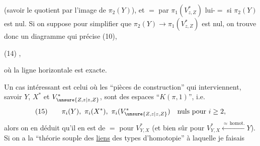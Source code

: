 (savoir le quotient par l'image de $\pi_2(Y)$),
et $=$ par $\pi_1(V^*_{z,Z})$ lui-$=$ si $\pi_2(Y)$ est
nul. Si on suppose pour simplifier
que $\pi_2(Y)\longrightarrow\pi_1(V^*_{z,Z})$ est nul, on trouve
donc un diagramme qui précise (10),

\noindent (14)
,

où la ligne horizontale est exacte.

Un cas intéressant est celui où les
``pièces de construction'' qui  interviennent,
savoir $Y$, $X^*$ et $V^*_{\unsure{Z,z|z,Z}}$, sont des espaces
``$K(\pi,1)$'', i.e.
\[
(15)\qquad \pi_i(Y),\ \pi_i(X^*),\ \pi_i(V^*_{\unsure{Z,z|z,Z}})\quad\text{nuls pour }i\geq 2,
\]
alors on en déduit qu'il en est de $=$
pour $V^*_{Y,X}$ (et bien sûr pour $V^*_{Y,X}\xleftarrow{\approx\,\mathrm{homot.}}Y$).
Si on a la ``théorie souple des \uline{liens} des
types d'homotopie'' à laquelle je faisais
